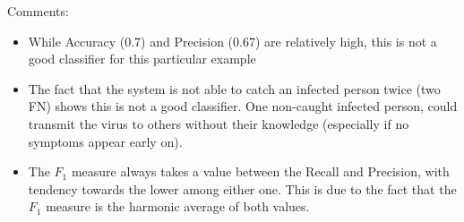 \documentclass{tron}
\begin{document}
\begin{example}{}
	Comments:
	\begin{itemize}
		\item While Accuracy (0.7) and Precision (0.67) are relatively high, this is not a good classifier for this particular example
		\item The fact that the system is not able to catch an infected person twice (two FN) shows this is not a good classifier. One non-caught infected person, could transmit the virus to others without their knowledge (especially if no symptoms appear early on).
		\item The $F_1$ measure always takes a value between the Recall and Precision, with tendency towards the lower among either one. This is due to the fact that the $F_1$ measure is the harmonic average of both values.
	\end{itemize}	
\end{example}
\end{document}
